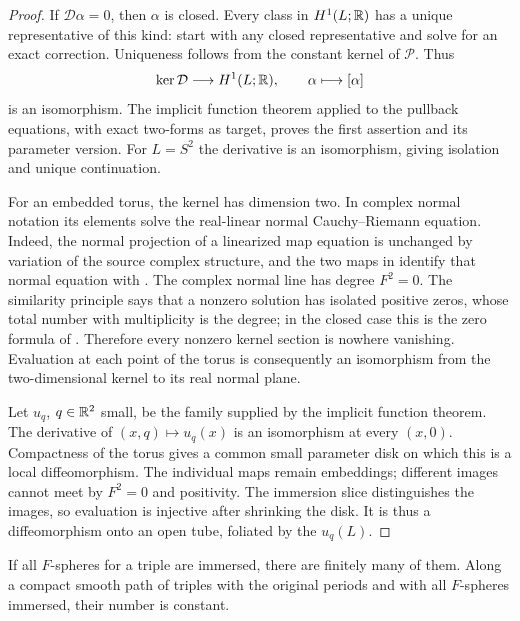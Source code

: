 \begin{proof}
If $\mathcal D\alpha=0$, then $\alpha$ is closed.  Every class in
$H^1(L;\mathbb R)$ has a unique representative of this kind: start with any
closed representative and solve  for
an exact correction.  Uniqueness follows from the constant kernel of
$\mathcal P$.  Thus
\begin{equation}\label{eq:pencil-kernel-cohomology}
 \ker\mathcal D\longrightarrow H^1(L;\mathbb R),\qquad
 \alpha\longmapsto[\alpha]
\end{equation}
is an isomorphism.  The implicit function theorem applied to the
pullback equations, with exact two-forms as target, proves the first
assertion and its parameter version.  For $L=S^2$ the derivative is
an isomorphism, giving isolation and unique continuation.

For an embedded torus, the kernel has dimension two.  In complex
normal notation its elements solve the real-linear normal
Cauchy--Riemann equation.  Indeed, the normal projection of a
linearized map equation is unchanged by variation of the source
complex structure, and the two maps in
 identify that normal equation
with .  The complex normal line has
degree $F^2=0$.  The similarity principle says that a nonzero solution
has isolated positive zeros, whose total number with multiplicity is
the degree; in the closed case this is the zero formula of
\cite[Section~2.2, Equation~(2.7)]{Wendl2010}.  Therefore every nonzero
kernel section is nowhere vanishing.  Evaluation at each point of the
torus is consequently an isomorphism from the two-dimensional kernel
to its real normal plane.

Let $u_q$, $q\in\mathbb R^2$ small, be the family supplied by the implicit
function theorem.  The derivative of $(x,q)\mapsto u_q(x)$ is an
isomorphism at every $(x,0)$.  Compactness of the torus gives a common
small parameter disk on which this is a local diffeomorphism.  The
individual maps remain embeddings; different images cannot meet by
$F^2=0$ and positivity.  The immersion slice distinguishes the images,
so evaluation is injective after shrinking the disk.  It is thus a
diffeomorphism onto an open tube, foliated by the $u_q(L)$.
\end{proof}

\begin{corollary}
\label{cor:pencil-node-count}
If all $F$-spheres for a triple are immersed, there are finitely many
of them.  Along a compact smooth path of triples with the original
periods and with all $F$-spheres immersed, their number is constant.
\end{corollary}


